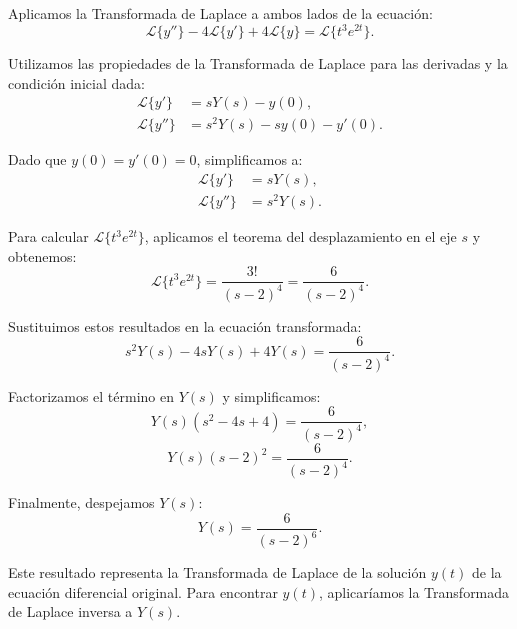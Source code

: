 \documentclass{article}
\begin{document}
Aplicamos la Transformada de Laplace a ambos lados de la ecuación:
\begin{equation}
    \mathcal{L}\{y''\} - 4\mathcal{L}\{y'\} + 4\mathcal{L}\{y\} = \mathcal{L}\{t^3e^{2t}\}.
\end{equation}

Utilizamos las propiedades de la Transformada de Laplace para las derivadas y la condición inicial dada:
\begin{align*}
    \mathcal{L}\{y'\}  & = sY(s) - y(0),            \\
    \mathcal{L}\{y''\} & = s^2Y(s) - sy(0) - y'(0).
\end{align*}

Dado que \(y(0) = y'(0) = 0\), simplificamos a:
\begin{align*}
    \mathcal{L}\{y'\}  & = sY(s),   \\
    \mathcal{L}\{y''\} & = s^2Y(s).
\end{align*}

Para calcular \(\mathcal{L}\{t^3e^{2t}\}\), aplicamos el teorema del desplazamiento en el eje \(s\) y obtenemos:
\begin{equation}
    \mathcal{L}\{t^3e^{2t}\} = \frac{3!}{(s-2)^4} = \frac{6}{(s-2)^4}.
\end{equation}

Sustituimos estos resultados en la ecuación transformada:
\begin{equation}
    s^2Y(s) - 4sY(s) + 4Y(s) = \frac{6}{(s-2)^4}.
\end{equation}

Factorizamos el término en \(Y(s)\) y simplificamos:
\begin{equation}
    Y(s)(s^2 - 4s + 4) = \frac{6}{(s-2)^4},
\end{equation}
\begin{equation}
    Y(s)(s - 2)^2 = \frac{6}{(s-2)^4}.
\end{equation}

Finalmente, despejamos \(Y(s)\):
\begin{equation}
    Y(s) = \frac{6}{(s-2)^6}.
\end{equation}

Este resultado representa la Transformada de Laplace de la solución \(y(t)\) de la ecuación diferencial original. Para encontrar \(y(t)\), aplicaríamos la Transformada de Laplace inversa a \(Y(s)\).
\end{document}

